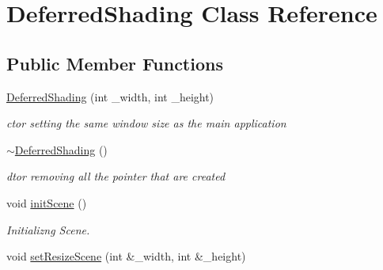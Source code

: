 \hypertarget{class_deferred_shading}{\section{Deferred\-Shading Class Reference}
\label{class_deferred_shading}
}
\subsection*{Public Member Functions}
\begin{DoxyCompactItemize}
\item 
\hypertarget{class_deferred_shading_ab7d27bb57a296dcd0927b8382bd75d5f}{\hyperlink{class_deferred_shading_ab7d27bb57a296dcd0927b8382bd75d5f}{Deferred\-Shading} (int \-\_\-width, int \-\_\-height)}\label{class_deferred_shading_ab7d27bb57a296dcd0927b8382bd75d5f}

\begin{DoxyCompactList}\small\item\em ctor setting the same window size as the main application \end{DoxyCompactList}\item 
\hypertarget{class_deferred_shading_ac237f4f2a96e2d9871011f9c9978af85}{\hyperlink{class_deferred_shading_ac237f4f2a96e2d9871011f9c9978af85}{$\sim$\-Deferred\-Shading} ()}\label{class_deferred_shading_ac237f4f2a96e2d9871011f9c9978af85}

\begin{DoxyCompactList}\small\item\em dtor removing all the pointer that are created \end{DoxyCompactList}\item 
\hypertarget{class_deferred_shading_a2fad3267f5e62743175e6f430257ca3a}{void \hyperlink{class_deferred_shading_a2fad3267f5e62743175e6f430257ca3a}{init\-Scene} ()}\label{class_deferred_shading_a2fad3267f5e62743175e6f430257ca3a}

\begin{DoxyCompactList}\small\item\em Initializng Scene. \end{DoxyCompactList}\item 
\hypertarget{class_deferred_shading_ab64677da33f7c88f08520b38497eabfa}{void \hyperlink{class_deferred_shading_ab64677da33f7c88f08520b38497eabfa}{set\-Resize\-Scene} (int \&\-\_\-width, int \&\-\_\-height)}\label{class_deferred_shading_ab64677da33f7c88f08520b38497eabfa}


\end{DoxyCompactItemize}

